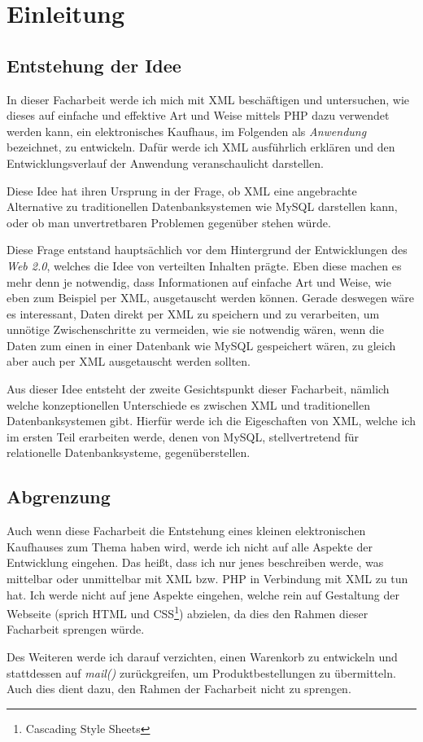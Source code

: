 
\chapter{Einleitung}
\section{Entstehung der Idee}
In dieser Facharbeit werde ich mich mit XML beschäftigen und
untersuchen, wie dieses auf einfache und effektive Art und Weise
mittels PHP dazu verwendet werden kann, ein elektronisches Kaufhaus,
im Folgenden als {\em Anwendung} bezeichnet, zu entwickeln. Dafür werde
ich XML ausführlich erklären und den Entwicklungsverlauf der Anwendung
veranschaulicht darstellen.

Diese Idee hat ihren Ursprung in der Frage, ob XML eine angebrachte
Alternative zu traditionellen Datenbanksystemen wie MySQL darstellen
kann, oder ob man unvertretbaren Problemen gegenüber stehen würde.

Diese Frage entstand hauptsächlich vor dem Hintergrund der
Entwicklungen des {\em Web 2.0}, welches die Idee von verteilten
Inhalten prägte. Eben diese machen es mehr denn je notwendig, dass
Informationen auf einfache Art und Weise, wie eben zum Beispiel per XML,
ausgetauscht werden können. Gerade deswegen wäre es interessant, Daten
direkt per XML zu speichern und zu verarbeiten, um unnötige
Zwischenschritte zu vermeiden, wie sie notwendig wären, wenn die Daten
zum einen in einer Datenbank wie MySQL gespeichert wären, zu gleich
aber auch per XML ausgetauscht werden sollten.

Aus dieser Idee entsteht der zweite Gesichtspunkt dieser Facharbeit,
nämlich welche konzeptionellen Unterschiede es zwischen XML und
traditionellen Datenbanksystemen gibt. Hierfür werde ich die
Eigeschaften von XML, welche ich im ersten Teil erarbeiten werde,
denen von MySQL, stellvertretend für relationelle Datenbanksysteme,
gegenüberstellen.

\section{Abgrenzung}
Auch wenn diese Facharbeit die Entstehung eines kleinen elektronischen
Kaufhauses zum Thema haben wird, werde ich nicht auf alle Aspekte der
Entwicklung eingehen. Das heißt, dass ich nur jenes beschreiben werde,
was mittelbar oder unmittelbar mit XML bzw. PHP in Verbindung mit XML
zu tun hat. Ich werde nicht auf jene Aspekte eingehen, welche rein auf
Gestaltung der Webseite (sprich HTML und CSS\footnote{Cascading Style Sheets}) abzielen, da dies den
Rahmen dieser Facharbeit sprengen würde.

Des Weiteren werde ich darauf verzichten, einen Warenkorb zu
entwickeln und stattdessen auf {\em mail()} zurückgreifen, um
Produktbestellungen zu übermitteln. Auch dies dient dazu, den Rahmen
der Facharbeit nicht zu sprengen.

